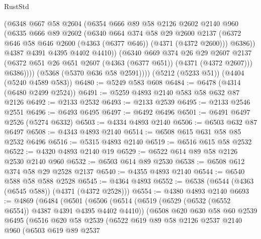 \begin{lexlean}{RustStd}
\begin{coremodule}
{\begin{coremodule}
{{{{{{{{{{{{{{{{              (@6348
                @667
                @58
                @2604
                (@6354
                  @666
                  @89
                  @58
                  @2126
                  @2602
                  @2140
                  @960
                  (@6335
                    @666
                    @89
                    @2602
                    (@6340
                      @664
                      @374
                      @58
                      @29
                      @2600
                      @2137
                      (@6372 @646 @58 @646 @2600 (@4363 (@6377 @646)) (@4371 (@4372 @2600)))
                      @6386))
                  @4387
                  @4391
                  @4395
                  @4402
                  @4410))
              (@6340
                @669
                @374
                @26
                @29
                @2607
                @2137
                (@6372 @651 @26 @651 @2607 (@4363 (@6377 @651)) (@4371 (@4372 @2607)))
                @6386))))
        (@5368 (@5370 @636 @58 @2591))))
    (@5212 (@5233 @51))
    (@4404 (@5240 @4589 @583))
@6480 := @5249 @583 @608
@6484 := @6478 (@4314 (@6480 @2499 @2524))
@6491 := @5259 @4893 @2140 @583 @58 @632 @87 @2126
@6492 := @2133 @2532
@6493 := @2133 @2539
@6495 := @2133 @2546 @2551
@6496 := @6493 @6495
@6497 := @6492 @6496
@6501 := @6491 @6497 @2526 (@5274 @6332)
@6503 := @4334 @4893 @2140
@6506 := @6503 @632 @87 @6497
@6508 := @4343 @4893 @2140
@6514 := @6508 @615 @631 @58 @85 @2532 @6496
@6516 := @5315 @4893 @2140
@6519 := @6516 @615 @58 @2532
@6522 := @4320 @4893 @2140 @19
@6529 := @6522 @614 @89 @58 @2126 @2530 @2140 @960
@6532 := @6503 @614 @89 @2530
@6538 := @6508 @612 @374 @58 @29 @2528 @2137
@6540 := @4355 @4893 @2140
@6544 := @6540 @588 @58 @588 @2528
@6545 := @4364 @4893
@6552 := @6538 (@6544 (@4363 (@6545 @588)) (@4371 (@4372 @2528)))
@6554 := @4380 @4893 @2140
@6693 := @4869
    (@6484
      (@6501
        (@6506
          (@6514
            (@6519 (@6529 (@6532 (@6552 @6554)) @4387 @4391 @4395 @4402 @4410))
            (@6508
              @620
              @630
              @58
              @60
              @2539
              @6495
              (@6516
                @620
                @58
                @2539
                (@6522
                  @619
                  @89
                  @58
                  @2126
                  @2537
                  @2140
                  @960
                  (@6503
                    @619
                    @89
                    @2537
}}}}}}}}}}}}}}}}
\end{coremodule}}
\end{coremodule}
\end{lexlean}
